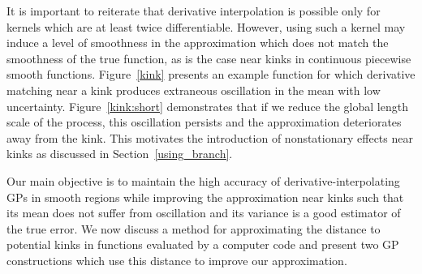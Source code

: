 \documentclass{article}
\begin{document}
It is important to reiterate that derivative interpolation is possible only for kernels which are at least twice differentiable. However, using such a kernel may induce a level of smoothness in the approximation which does not match the smoothness of the true function, as is the case near kinks in continuous piecewise smooth functions. Figure~\ref{kink} presents an example function for which derivative matching near a kink produces extraneous oscillation in the mean with low uncertainty. Figure~\ref{kink:short} demonstrates that if we reduce the global length scale of the process, this oscillation persists and the approximation deteriorates away from the kink. This motivates the introduction of nonstationary effects near kinks as discussed in Section~\ref{using_branch}.

Our main objective is to maintain the high accuracy of derivative-interpolating GPs in smooth regions while improving the approximation near kinks such that its mean does not suffer from oscillation and its variance is a good estimator of the true error. We now discuss a method for approximating the distance to potential kinks in functions evaluated by a computer code and present two GP constructions which use this distance to improve our approximation.
\end{document}
